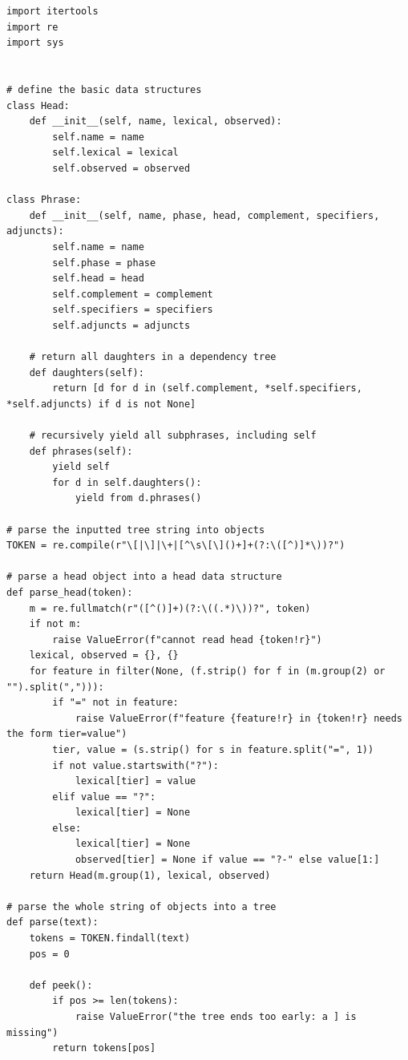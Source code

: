 \begin{verbatim}
import itertools
import re
import sys


# define the basic data structures
class Head:
    def __init__(self, name, lexical, observed):
        self.name = name
        self.lexical = lexical
        self.observed = observed

class Phrase:
    def __init__(self, name, phase, head, complement, specifiers, adjuncts):
        self.name = name
        self.phase = phase
        self.head = head
        self.complement = complement
        self.specifiers = specifiers
        self.adjuncts = adjuncts

    # return all daughters in a dependency tree
    def daughters(self):
        return [d for d in (self.complement, *self.specifiers, *self.adjuncts) if d is not None]

    # recursively yield all subphrases, including self
    def phrases(self):
        yield self
        for d in self.daughters():
            yield from d.phrases()

# parse the inputted tree string into objects
TOKEN = re.compile(r"\[|\]|\+|[^\s\[\]()+]+(?:\([^)]*\))?")

# parse a head object into a head data structure
def parse_head(token):
    m = re.fullmatch(r"([^()]+)(?:\((.*)\))?", token)
    if not m:
        raise ValueError(f"cannot read head {token!r}")
    lexical, observed = {}, {}
    for feature in filter(None, (f.strip() for f in (m.group(2) or "").split(","))):
        if "=" not in feature:
            raise ValueError(f"feature {feature!r} in {token!r} needs the form tier=value")
        tier, value = (s.strip() for s in feature.split("=", 1))
        if not value.startswith("?"):
            lexical[tier] = value
        elif value == "?":
            lexical[tier] = None
        else:
            lexical[tier] = None
            observed[tier] = None if value == "?-" else value[1:]
    return Head(m.group(1), lexical, observed)

# parse the whole string of objects into a tree
def parse(text):
    tokens = TOKEN.findall(text)
    pos = 0

    def peek():
        if pos >= len(tokens):
            raise ValueError("the tree ends too early: a ] is missing")
        return tokens[pos]


\end{verbatim}

